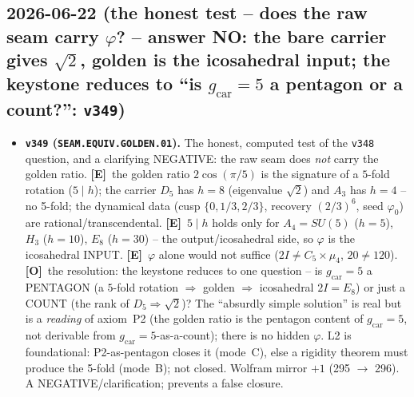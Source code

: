 \documentclass[11pt]{article}
\providecommand{\mE}{\textbf{[E]}}\providecommand{\mC}{\textbf{[C]}}
\providecommand{\mO}{\textbf{[O]}}\providecommand{\mX}{\textbf{[X]}}
\providecommand{\vref}[1]{\texttt{#1}}
\providecommand{\gcar}{g_{\mathrm{car}}}\providecommand{\Nfam}{N_{\mathrm{fam}}}
\begin{document}
\subsection*{2026-06-22 (the honest test -- does the raw seam carry $\varphi$? -- answer NO: the bare carrier gives $\sqrt2$, golden is the icosahedral input; the keystone reduces to ``is $g_{\mathrm{car}}{=}5$ a pentagon or a count?'': \texttt{v349})}
\begin{itemize}
\item \textbf{\texttt{v349} (\texttt{SEAM.EQUIV.GOLDEN.01}).} The honest, computed test of the \vref{v348}
question, and a clarifying NEGATIVE: the raw seam does \emph{not} carry the golden ratio. \mE\ the golden ratio
$2\cos(\pi/5)$ is the signature of a $5$-fold rotation ($5\mid h$); the carrier $D_5$ has $h{=}8$ (eigenvalue
$\sqrt2$) and $A_3$ has $h{=}4$ -- no 5-fold; the dynamical data (cusp $\{0,1/3,2/3\}$, recovery $(2/3)^6$, seed
$\varphi_0$) are rational/transcendental. \mE\ $5\mid h$ holds only for $A_4{=}SU(5)$ ($h{=}5$), $H_3$ ($h{=}10$),
$E_8$ ($h{=}30$) -- the output/icosahedral side, so $\varphi$ is the icosahedral INPUT. \mE\ $\varphi$ alone would
not suffice ($2I\neq C_5\times\mu_4$, $20\neq120$). \mO\ the resolution: the keystone reduces to one question --
is $\gcar{=}5$ a PENTAGON (a $5$-fold rotation $\Rightarrow$ golden $\Rightarrow$ icosahedral $2I=E_8$) or just a
COUNT (the rank of $D_5\Rightarrow\sqrt2$)? The ``absurdly simple solution'' is real but is a \emph{reading} of
axiom~P2 (the golden ratio is the pentagon content of $\gcar{=}5$, not derivable from $\gcar{=}5$-as-a-count); there
is no hidden $\varphi$. L2 is foundational: P2-as-pentagon closes it (mode~C), else a rigidity theorem must produce
the 5-fold (mode~B); not closed. Wolfram mirror $+1$ (295 $\to$ 296). A NEGATIVE/clarification; prevents a false
closure.
\end{itemize}
\end{document}
